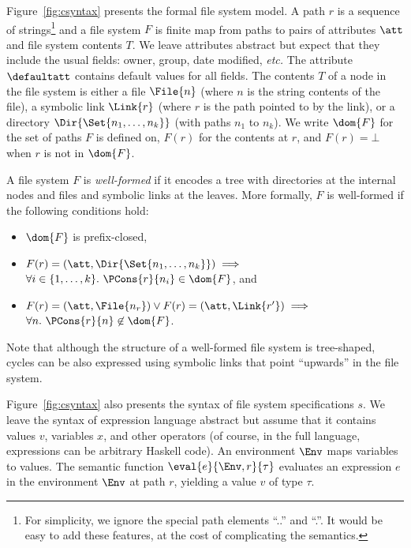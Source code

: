 %
Figure~\ref{fig:csyntax} presents the formal file system
model. A path $r$ is a sequence of strings\footnote{For simplicity, we
  ignore the special path elements ``..'' and ``.''.  It would be easy
  to add these features, at the cost of complicating the semantics.}
and a file system $F$ is finite map from paths to pairs of attributes
$\att$ and file system contents $T$.  We leave attributes abstract but
expect that they include the usual fields: owner, group, date
modified, {\it etc.}  The attribute $\defaultatt$ contains default
values for all fields. The contents $T$ of a node in the file system
is either a file $\File{n}$ (where $n$ is the string contents of the
file), a symbolic link $\Link{r}$ (where $r$ is the path pointed to by
the link), or a directory $\Dir{\Set{n_1,\dots,n_k}}$ (with paths
$n_1$ to $n_k$). We write $\dom{F}$ for the set of paths $F$ is defined on, 
$F(r)$ for the contents at $r$, and $F(r) = \bot$ when $r$ is not
in $\dom{F}$.

A file system $F$ is {\em well-formed} if it encodes a tree with
directories at the internal nodes and files and symbolic links at the
leaves. More formally, $F$ is well-formed if the following conditions
hold:
%
\begin{itemize}
\item $\dom{F}$ is prefix-closed,
\item $F(r) = (\att,\Dir{ \Set{n_1,\dots,n_k} }) \implies$\\ \hspace*{3.3mm}$\forall i \in \{1,\dots,k\}.~\PCons{r}{n_i} \in \dom{F}$, and
\item $F(r) = (\att,\File{n_r}) \vee F(r) = (\att,\Link{r'}) \implies$\\ \hspace*{3.3mm}$\forall n.~\PCons{r}{n} \not\in \dom{F}$.
\end{itemize}
%
Note that although the structure of a well-formed file system is
tree-shaped, cycles can be also expressed using symbolic links that
point ``upwards'' in the file system.

%
Figure~\ref{fig:csyntax} also presents the syntax of file
system specifications $s$.  We leave the syntax of expression language
abstract but assume that it contains values $v$, variables $x$, and
other operators (of course, in the full \forest{} language,
expressions can be arbitrary Haskell code).  An environment $\Env$
maps variables to values.  The semantic function
$\eval{e}{\Env,r}{\tau}$ evaluates an expression $e$ in the
environment $\Env$ at path $r$, yielding a value $v$ of type $\tau$.

